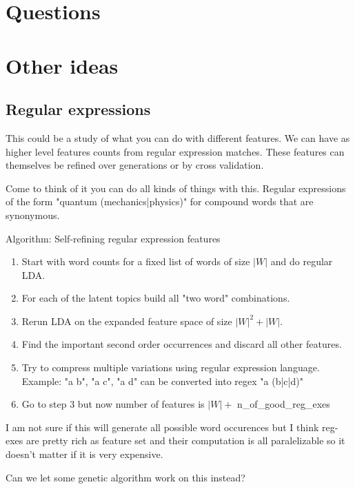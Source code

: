 \documentclass[11pt]{article}
\begin{document}
    

	
\section{Questions}

	
	
	
\section{Other ideas}

	\subsection{Regular expressions}
	
		This could be a study of what you can do with different features.
		We can have as higher level features counts from regular expression matches.
		These features can themselves be refined over generations or by cross validation.
		
		Come to think of it you can do all kinds of things with this.
		Regular expressions of the form "quantum (mechanics|physics)" for compound words 
		that are synonymous. 
		
		Algorithm: Self-refining regular expression features
		\begin{enumerate}
			\item	Start with word counts for a fixed list of words of size $|W|$ and do regular LDA.
			\item	For each of the latent topics build all "two word" combinations.
			\item	Rerun LDA on the expanded feature space of size $|W|^2 + |W|$.
			\item	Find the important second order occurrences and discard all other features.
			\item	Try to compress multiple variations using regular expression language. \\
					Example: "a b", "a c", "a d"  can be converted into regex "a (b|c|d)"
			\item	Go to step 3 but now number of features is $|W|+$ n\_of\_good\_reg\_exes
		\end{enumerate}

		I am not sure if this will generate all possible word occurences but I think reg-exes are
		pretty rich as feature set and their computation is all paralelizable so it doesn't matter if 
		it is very expensive.
		
		
		Can we let some genetic algorithm work on this instead?
\end{document}
